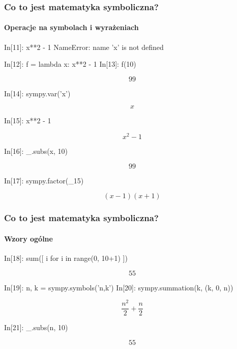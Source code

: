 \documentclass[10pt]{beamer}
\begin{document}
\begin{frame}[fragile]
  \frametitle{Co to jest matematyka symboliczna?}
  \framesubtitle{Operacje na symbolach i wyrażeniach}

  \begin{python}
  In[11]: x**2 - 1
  NameError: name 'x' is not defined
  \end{python}

  \begin{python}
  In[12]: f = lambda x: x**2 - 1
  In[13]: f(10)
  \end{python}
  \begin{equation*}
  99
  \end{equation*}

  \begin{python}
  In[14]: sympy.var('x')
  \end{python}
  \begin{equation*}
  x
  \end{equation*}

  \begin{python}
  In[15]: x**2 - 1
  \end{python}
  \begin{equation*}
  x^{2} - 1
  \end{equation*}

  \begin{python}
  In[16]: _.subs(x, 10)
  \end{python}
  \begin{equation*}
  99
  \end{equation*}

  \begin{python}
  In[17]: sympy.factor(_15)
  \end{python}
  \begin{equation*}
  \left(x - 1\right) \left(x + 1\right)
  \end{equation*}
\end{frame}

\begin{frame}[fragile]
  \frametitle{Co to jest matematyka symboliczna?}
  \framesubtitle{Wzory ogólne}

  \begin{python}
  In[18]: sum([ i for i in range(0, 10+1) ])
  \end{python}
  \begin{equation*}
  55
  \end{equation*}

  \begin{python}
  In[19]: n, k = sympy.symbols('n,k')
  In[20]: sympy.summation(k, (k, 0, n))
  \end{python}
  \begin{equation*}
  \frac{n^{2}}{2} + \frac{n}{2}
  \end{equation*}

  \begin{python}
  In[21]: _.subs(n, 10)
  \end{python}
  \begin{equation*}
  55
  \end{equation*}
\end{frame}
\end{document}
